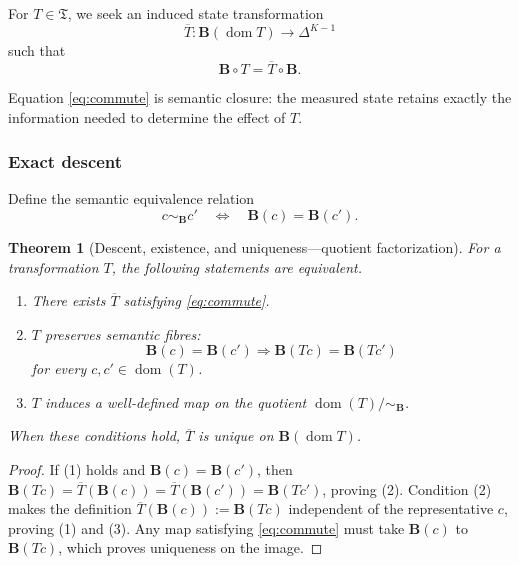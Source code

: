 \documentclass[11pt]{article}
\newtheorem{theorem}[definition]{Theorem}
\newcommand{\Ctxt}{\mathcal C}
\newcommand{\Trans}{\mathfrak T}
\newcommand{\Bmap}{\mathbf B}
\newcommand{\Kern}{\mathsf K}
\begin{document}
For $T\in\Trans$, we seek an induced state transformation
\[
 \overline T:\Bmap(\operatorname{dom}T)\longrightarrow\Delta^{K-1}
\]
such that
\begin{equation}\label{eq:commute}
 \Bmap\circ T=\overline T\circ\Bmap.
\end{equation}

\begin{center}
\end{center}

Equation \eqref{eq:commute} is semantic closure: the measured state retains exactly the information needed to determine the effect of $T$.

\subsubsection{Exact descent}

Define the semantic equivalence relation
\[
 c\sim_{\Bmap}c'\quad\Longleftrightarrow\quad\Bmap(c)=\Bmap(c').
\]

\begin{theorem}[Descent, existence, and uniqueness---quotient factorization]\label{thm:descent}
For a transformation $T$, the following statements are equivalent.
\begin{enumerate}
\item There exists $\overline T$ satisfying \eqref{eq:commute}.
\item $T$ preserves semantic fibres:
\[
 \Bmap(c)=\Bmap(c')\Longrightarrow\Bmap(Tc)=\Bmap(Tc')
\]
for every $c,c'\in\operatorname{dom}(T)$.
\item $T$ induces a well-defined map on the quotient $\operatorname{dom}(T)/{\sim_{\Bmap}}$.
\end{enumerate}
When these conditions hold, $\overline T$ is unique on $\Bmap(\operatorname{dom}T)$.
\end{theorem}

\begin{proof}
If (1) holds and $\Bmap(c)=\Bmap(c')$, then
$\Bmap(Tc)=\overline T(\Bmap(c))=\overline T(\Bmap(c'))=\Bmap(Tc')$, proving (2). Condition (2) makes the definition
$\overline T(\Bmap(c)):=\Bmap(Tc)$ independent of the representative $c$, proving (1) and (3). Any map satisfying \eqref{eq:commute} must take $\Bmap(c)$ to $\Bmap(Tc)$, which proves uniqueness on the image.
\end{proof}
\end{document}
